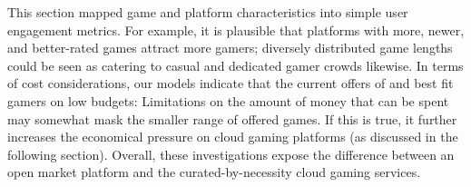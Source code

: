 This section mapped game and platform characteristics into simple user engagement metrics. For example, it is plausible that platforms with more, newer, and better-rated games attract more gamers; diversely distributed game lengths could be seen as catering to casual and dedicated gamer crowds likewise.
In terms of cost considerations, our models indicate that the current offers of \gfnow and \psnow best fit gamers on low budgets: Limitations on the amount of money that can be spent may somewhat mask the smaller range of offered games. If this is true, it further increases the economical pressure on cloud gaming platforms (as discussed in the following section). Overall, these investigations  expose the difference between an open market platform and the curated-by-necessity cloud gaming services.













